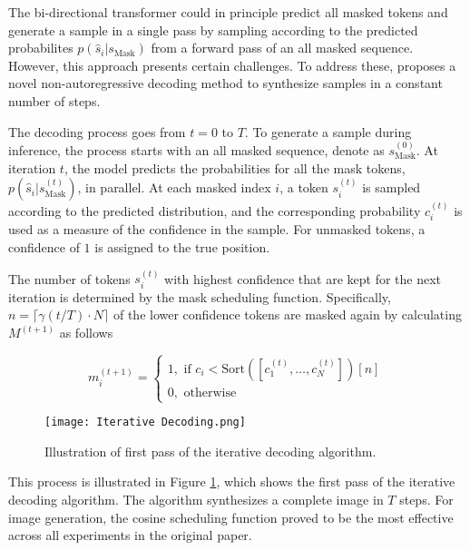\documentclass[../../thesis.tex]{subfiles}
\begin{document}
The bi-directional transformer could in principle predict all masked tokens and generate a sample in a single pass by sampling according to the predicted probabilites $p(\widehat{s}_i|s_\text{Mask})$ from a forward pass of an all masked sequence. However, this approach presents certain challenges. To address these, \cite{chang2022maskgit} proposes a novel non-autoregressive decoding method to synthesize samples in a constant number of steps.\newline

The decoding process goes from $t = 0$ to $T$. To generate a sample during inference, the process starts with an all masked sequence, denote as $s_\text{Mask}^{(0)}$. At iteration $t$, the model predicts the probabilities for all the mask tokens, $p(\widehat{s}_i|s_\text{Mask}^{(t)})$, in parallel. At each masked index $i$, a token $s_i^{(t)}$ is sampled according to the predicted distribution, and the corresponding probability $c_i^{(t)}$ is used as a measure of the confidence in the sample. For unmasked tokens, a confidence of $1$ is assigned to the true position.\newline

The number of tokens $s_i^{(t)}$ with highest confidence that are kept for the next iteration is determined by the mask scheduling function. Specifically, $n = \lceil \gamma(t/T)\cdot N \rceil$ of the lower confidence tokens are masked again by calculating $M^{(t+1)}$ as follows

\begin{equation}
    m_i^{(t+1)} = 
    \begin{cases}
        1, \text{ if } c_i < \text{Sort}([c_1^{(t)},\dots,c_N^{(t)}])[n]\\
        0, \text{ otherwise} 
    \end{cases}
\end{equation}

\begin{figure}[h]
    \texttt{[image: Iterative Decoding.png]}
    \centering 
    \caption{Illustration of first pass of the iterative decoding algorithm.}
    \label{fig:IterativeDecoding}
\end{figure}

This process is illustrated in Figure \ref{fig:IterativeDecoding}, which shows the first pass of the iterative decoding algorithm. The algorithm synthesizes a complete image in $T$ steps. For image generation, the cosine scheduling function proved to be the most effective across all experiments in the original paper.
\end{document}

